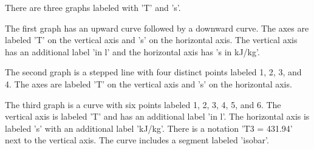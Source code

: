 There are three graphs labeled with 'T' and 's'. 

The first graph has an upward curve followed by a downward curve. The axes are labeled 'T' on the vertical axis and 's' on the horizontal axis. The vertical axis has an additional label 'in l' and the horizontal axis has 's in kJ/kg'.

The second graph is a stepped line with four distinct points labeled 1, 2, 3, and 4. The axes are labeled 'T' on the vertical axis and 's' on the horizontal axis.

The third graph is a curve with six points labeled 1, 2, 3, 4, 5, and 6. The vertical axis is labeled 'T' and has an additional label 'in l'. The horizontal axis is labeled 's' with an additional label 'kJ/kg'. There is a notation 'T3 = 431.94' next to the vertical axis. The curve includes a segment labeled 'isobar'.